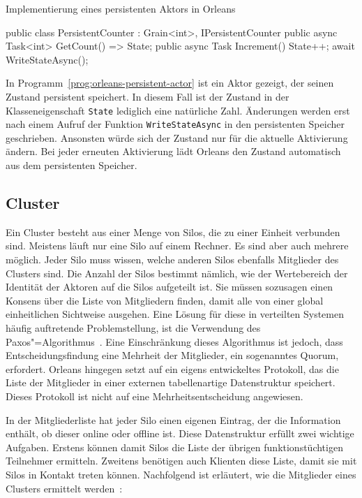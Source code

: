 \begin{program}[!hbt]
\caption{Implementierung eines persistenten Aktors in Orleans}
\label{prog:orleans-persistent-actor}
\begin{CsCode}
[StorageProvider(ProviderName="<provider-name>")]
public class PersistentCounter : Grain<int>, IPersistentCounter   {
	public async Task<int> GetCount() => State;
	public async Task Increment() {
		State++;
		await WriteStateAsync();
	}
}
\end{CsCode}
\end{program}

In Programm~\ref{prog:orleans-persistent-actor} ist ein Aktor gezeigt, der seinen Zustand persistent speichert. In diesem Fall ist der Zustand in der Klasseneigenschaft \lstinline{State} lediglich eine natürliche Zahl. Änderungen werden erst nach einem Aufruf der Funktion \lstinline{WriteStateAsync} in den persistenten Speicher geschrieben. Ansonsten würde sich der Zustand nur für die aktuelle Aktivierung ändern. Bei jeder erneuten Aktivierung lädt Orleans den Zustand automatisch aus dem persistenten Speicher.

\subsection{Cluster}

Ein Cluster besteht aus einer Menge von Silos, die zu einer Einheit verbunden sind. Meistens läuft nur eine Silo auf einem Rechner. Es sind aber auch mehrere möglich. Jeder Silo muss wissen, welche anderen Silos ebenfalls Mitglieder des Clusters sind. Die Anzahl der Silos bestimmt nämlich, wie der  Wertebereich der Identität der Aktoren auf die Silos aufgeteilt ist. Sie müssen sozusagen einen Konsens über die Liste von Mitgliedern finden, damit alle von einer global einheitlichen Sichtweise ausgehen. Eine Lösung für diese in verteilten Systemen häufig auftretende Problemstellung, ist die Verwendung des Paxos"=Algorithmus~\cite{Lamport:1998:PP:279227.279229}. Eine Einschränkung dieses Algorithmus ist jedoch, dass Entscheidungsfindung eine Mehrheit der Mitglieder, ein sogenanntes Quorum, erfordert. Orleans hingegen setzt auf ein eigens entwickeltes Protokoll, das die Liste der Mitglieder in einer externen tabellenartige Datenstruktur speichert. Dieses Protokoll ist nicht auf eine Mehrheitsentscheidung angewiesen.

In der Mitgliederliste hat jeder Silo einen eigenen Eintrag, der \zB die Information enthält, ob dieser online oder offline ist. Diese Datenstruktur erfüllt zwei wichtige Aufgaben. Erstens können damit Silos die Liste der übrigen funktionstüchtigen Teilnehmer ermitteln. Zweitens benötigen auch Klienten diese Liste, damit sie mit Silos in Kontakt treten können. Nachfolgend ist erläutert, wie die Mitglieder eines Clusters ermittelt werden~\cite{Bernstein2014}:

